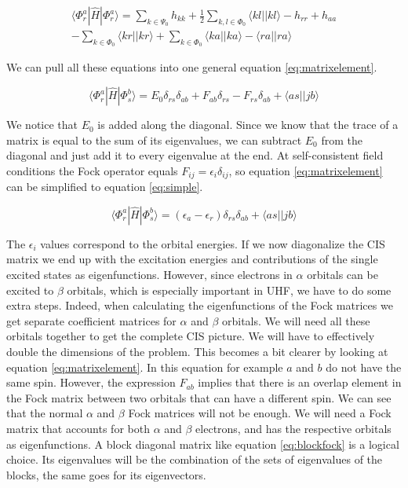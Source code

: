 \begin{multline}\label{eq:exp3}
  \langle \Phi^a_r|\hat{H}|\Phi^a_r \rangle = \sum_{k \in \Psi_0}h_{kk} + \frac{1}{2}\sum_{k,l \in \Phi_0} \langle kl||kl \rangle - h_{rr} + h_{aa} \\ - \sum_{k \in \Phi_0} \langle
  kr || kr \rangle + \sum_{k \in \Phi_0} \langle ka||ka \rangle - \langle ra||ra \rangle
\end{multline}

We can pull all these equations into one general equation \eqref{eq:matrixelement}.

\begin{equation}\label{eq:matrixelement}
  \langle \Phi_r^a|\hat{H}|\Phi_s^b \rangle = E_0\delta_{rs}\delta_{ab} + F_{ab}\delta_{rs} - F_{rs}\delta_{ab} + \langle as || jb \rangle
\end{equation}

We notice that $E_0$ is added along the diagonal. Since we know that the trace of a matrix is equal to the sum of its eigenvalues, we can subtract $E_0$ from the diagonal and just
add it to every eigenvalue at the end. At self-consistent field conditions the Fock operator equals $F_{ij} = \epsilon_i\delta_{ij}$, so equation \eqref{eq:matrixelement} can be
simplified to equation \eqref{eq:simple}.

\begin{equation}\label{eq:simple}
  \langle \Phi_r^a|\hat{H}|\Phi_s^b \rangle = (\epsilon_a - \epsilon_r)\delta_{rs}\delta_{ab} + \langle as || jb \rangle
\end{equation}

The $\epsilon_i$ values correspond to the orbital energies. If we now diagonalize the CIS matrix we end up with the excitation energies and contributions of the single excited states as
eigenfunctions. However, since electrons in $\alpha$ orbitals can be excited to $\beta$ orbitals, which is especially important in UHF, we have to do some extra steps. Indeed, when
calculating the eigenfunctions of the Fock matrices we get separate coefficient matrices for $\alpha$ and $\beta$ orbitals. We will need all these orbitals together to get the complete
CIS picture. We will have to effectively double the dimensions of the problem. This becomes a bit clearer by looking at equation \eqref{eq:matrixelement}. In this equation for example
$a$ and $b$ do not have the same spin. However, the expression $F_{ab}$ implies that there is an overlap element in the Fock matrix between two orbitals that can have a different spin.
We can see that the normal $\alpha$ and $\beta$ Fock matrices will not be enough. We will need a Fock matrix that accounts for both $\alpha$ and $\beta$ electrons, and has the respective orbitals
as eigenfunctions. A block diagonal matrix like equation \eqref{eq:blockfock} is a logical choice. Its eigenvalues will be the combination of the sets of eigenvalues of the blocks,
the same goes for its eigenvectors.

